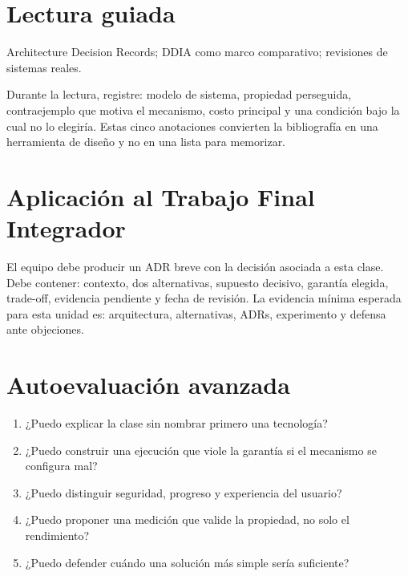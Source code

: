 \documentclass[variant=apuntes,cover=institutional,mode=screen]{ua-engineering-v6-article}
\begin{document}
\section{Lectura guiada}
Architecture Decision Records; DDIA como marco comparativo; revisiones de sistemas reales.

Durante la lectura, registre: modelo de sistema, propiedad perseguida, contraejemplo que motiva el mecanismo, costo principal y una condición bajo la cual no lo elegiría. Estas cinco anotaciones convierten la bibliografía en una herramienta de diseño y no en una lista para memorizar.

\section{Aplicación al Trabajo Final Integrador}
El equipo debe producir un ADR breve con la decisión asociada a esta clase. Debe contener: contexto, dos alternativas, supuesto decisivo, garantía elegida, trade-off, evidencia pendiente y fecha de revisión. La evidencia mínima esperada para esta unidad es: arquitectura, alternativas, ADRs, experimento y defensa ante objeciones.

\section{Autoevaluación avanzada}
\begin{enumerate}
\item ¿Puedo explicar la clase sin nombrar primero una tecnología?
\item ¿Puedo construir una ejecución que viole la garantía si el mecanismo se configura mal?
\item ¿Puedo distinguir seguridad, progreso y experiencia del usuario?
\item ¿Puedo proponer una medición que valide la propiedad, no solo el rendimiento?
\item ¿Puedo defender cuándo una solución más simple sería suficiente?
\end{enumerate}
\end{document}
